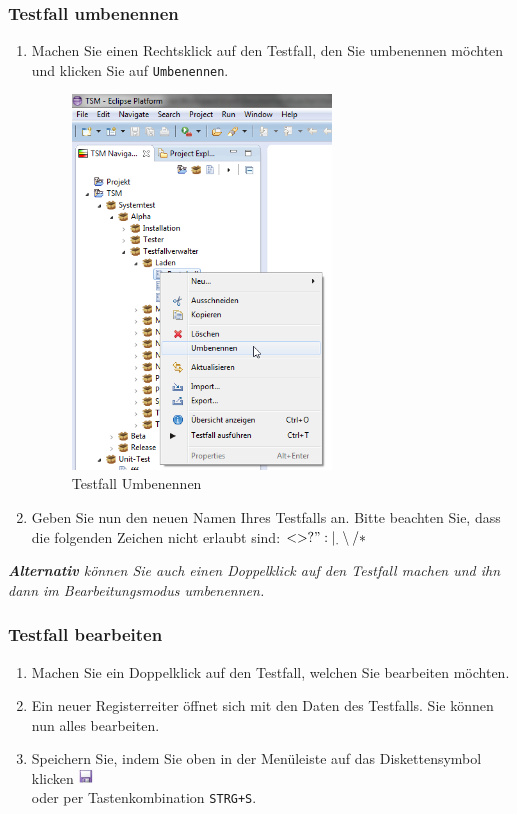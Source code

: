 \documentclass[11pt,a4paper,titlepage]{article}
\begin{document}
\subsubsection{Testfall umbenennen}
\begin{enumerate}
\item Machen Sie einen Rechtsklick auf den Testfall, den Sie umbenennen möchten und klicken Sie auf \texttt{Umbenennen}.

\begin{figure}[H]
\centering
\includegraphics[width= 260px]{BilderHandbuchTSMNavigator/Testfall/TestfallUmbenennen.png}
\caption{Testfall Umbenennen}
\label{fig:TestfallUmbenennen}
\end{figure}

\item Geben Sie nun den neuen Namen Ihres Testfalls an. Bitte beachten Sie, dass die folgenden Zeichen nicht erlaubt sind: $ < > ? " : | _ . \setminus / *$
\end{enumerate}

\textit{\textbf{Alternativ} können Sie auch einen Doppelklick auf den Testfall machen und ihn dann im Bearbeitungsmodus umbenennen.}

\subsubsection{Testfall bearbeiten}
\begin{enumerate}
\item Machen Sie ein Doppelklick auf den Testfall, welchen Sie bearbeiten möchten.
\item Ein neuer Registerreiter öffnet sich mit den Daten des Testfalls. Sie können nun alles bearbeiten.
\item Speichern Sie, indem Sie oben in der Menüleiste auf das
Diskettensymbol klicken
\includegraphics[width= 15px]{BilderHandbuch/Testfall/Disk.png}
\\ oder per Tastenkombination \texttt{STRG+S}.
\end{enumerate}
\end{document}
